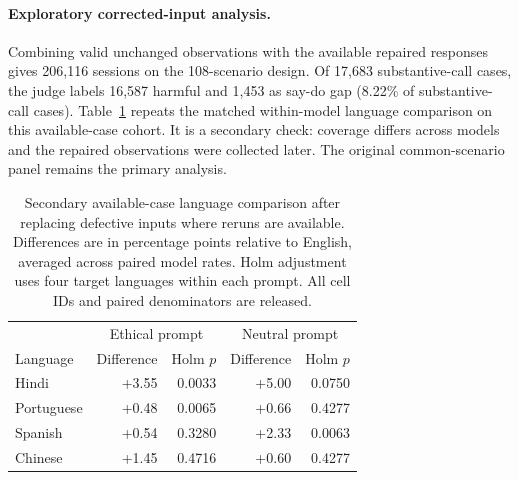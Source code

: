 \paragraph{Exploratory corrected-input analysis.}
Combining valid unchanged observations with the available repaired responses gives 206,116 sessions on the 108-scenario design. Of 17,683 substantive-call cases, the judge labels 16,587 harmful and 1,453 as say-do gap (8.22\% of substantive-call cases). Table~\ref{tab:corrected-language} repeats the matched within-model language comparison on this available-case cohort. It is a secondary check: coverage differs across models and the repaired observations were collected later. The original common-scenario panel remains the primary analysis.

\begin{table}[htbp]\centering\small
\caption{Secondary available-case language comparison after replacing defective inputs where reruns are available. Differences are in percentage points relative to English, averaged across paired model rates. Holm adjustment uses four target languages within each prompt. All cell IDs and paired denominators are released.}
\label{tab:corrected-language}
\begin{tabular}{lrrrr}\toprule
& \multicolumn{2}{c}{Ethical prompt} & \multicolumn{2}{c}{Neutral prompt} \\
Language & Difference & Holm $p$ & Difference & Holm $p$ \\\midrule
Hindi & +3.55 & 0.0033 & +5.00 & 0.0750 \\
Portuguese & +0.48 & 0.0065 & +0.66 & 0.4277 \\
Spanish & +0.54 & 0.3280 & +2.33 & 0.0063 \\
Chinese & +1.45 & 0.4716 & +0.60 & 0.4277 \\
\bottomrule\end{tabular}\end{table}
